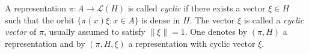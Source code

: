 A representation $\pi : A \to \mathcal{L}(H)$ is called \textit{cyclic} if there exists a vector $\xi \in H$ such that the orbit $\{\pi(x)\xi : x \in A\}$ is dense in $H$. The vector $\xi$ is called a \textit{cyclic vector} of $\pi$, usually assumed to satisfy $\|\xi\| = 1$. One denotes by $(\pi, H)$ a representation and by $(\pi, H, \xi)$ a representation with cyclic vector $\xi$.
